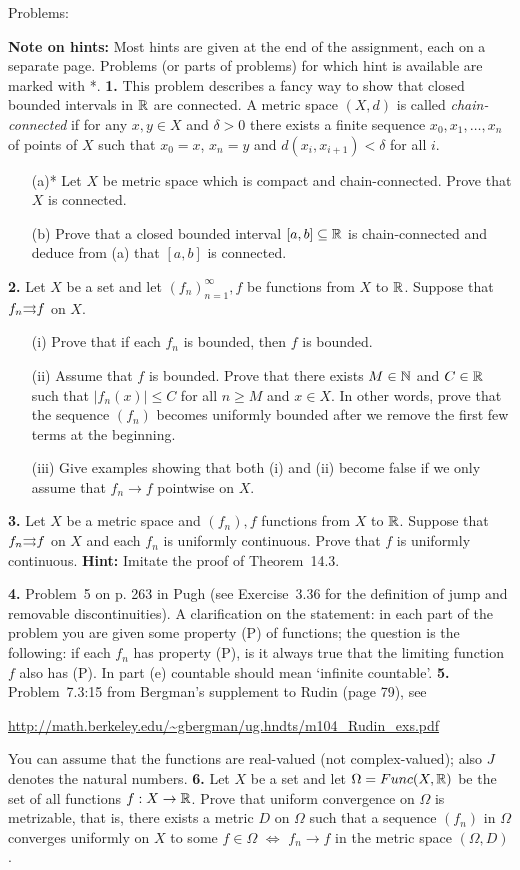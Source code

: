 \documentclass[11pt]{amsart}
\begin{document}
\skv
\bf\centerline{Problems: }\rm
\skv
{\bf Note on hints: } Most hints are given at the end of the assignment, each on a separate page.
Problems (or parts of problems) for which hint is available are marked with *. 
\skv
{\bf 1.} This problem describes a fancy way to show that closed bounded intervals
in ${\mathbb R}$ are connected. A metric space $(X,d)$ is called {\it chain-connected} if for any $x,y\in X$ and $\delta>0$
there exists a finite sequence $x_0,x_1,\ldots, x_n$ of points of $X$
such that $x_0=x$, $x_n=y$ and $d(x_i,x_{i+1})<\delta$ for all $i$. 
\begin{itemize}
\item[(a)*] Let $X$ be metric space which is compact and chain-connected.
Prove that $X$ is connected. 

\item[(b)] Prove that a closed bounded interval $[a,b]\subseteq {\mathbb R}$
is chain-connected and deduce from (a) that $[a,b]$ is connected.
\end{itemize}
\skv
{\bf 2.} Let $X$ be a set and let $(f_n)_{n=1}^{\infty}, f$ be functions from $X$ to ${\mathbb R}$.
Suppose that $f_n{\rightrightarrows} f$ on $X$.
\begin{itemize}
\item[(i)] Prove that if each $f_n$ is bounded, then $f$ is bounded.
\item[(ii)] Assume that $f$ is bounded. Prove that there exists $M\in{\mathbb N}$ and $C\in {\mathbb R}$ such that $|f_n(x)|\leq C$ for all
$n\geq M$ and $x\in X$. In other words, prove that the sequence $(f_n)$ becomes uniformly bounded after we remove the first few terms at the beginning.
\item[(iii)] Give examples showing that both (i) and (ii) become false if we only assume that $f_n\to f$ pointwise on $X$.
\end{itemize}
\skv
{\bf 3.} Let $X$ be a metric space and $(f_n),f$ functions from $X$ to ${\mathbb R}$.
Suppose that $f_n{\rightrightarrows} f$ on $X$ and each $f_n$ is uniformly continuous.
Prove that $f$ is uniformly continuous. {\bf Hint:} Imitate the proof
of Theorem~14.3.
\skv

\skv
{\bf 4.} Problem~5 on p. 263 in Pugh (see Exercise~3.36 for the definition of jump and removable discontinuities). A clarification on the statement: in each part of the problem you are given some property (P) of functions; the question is the following: if each $f_n$ has property (P), is it always true that the limiting function $f$ also has (P). In part (e) countable should mean `infinite countable'.
\skv
{\bf 5.} Problem~7.3:15 from Bergman's supplement to Rudin (page 79),
see
\skv
\centerline{\url{http://math.berkeley.edu/~gbergman/ug.hndts/m104_Rudin_exs.pdf}}
\skv
You can assume that the functions are real-valued (not complex-valued); also $J$ denotes
the natural numbers.
\skv
{\bf 6.} Let $X$ be a set and let $\Omega=Func(X,{\mathbb R})$ be the set of all functions $f:X\to {\mathbb R}$.
Prove that uniform convergence on $\Omega$ is metrizable, that is, there exists a metric $D$ on $\Omega$
such that a sequence $(f_n)$ in $\Omega$ converges uniformly on $X$ to some $f\in\Omega$ $\iff$
$f_n\to f$ in the metric space $(\Omega, D)$.
\end{document}
